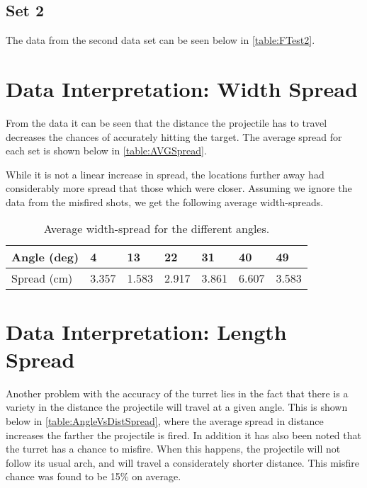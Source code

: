 \subsection{Set 2}
The data from the second data set can be seen below in \autoref{table:FTest2}. 

\section{Data Interpretation: Width Spread}
From the data it can be seen that the distance the projectile has to travel
decreases the chances of accurately hitting the target. The average spread for
each set is shown below in \autoref{table:AVGSpread}.


While it is not a linear increase in spread, the locations further away had
considerably more spread that those which were closer. Assuming we ignore the
data from the misfired shots, we get the following average width-spreads. 

\begin{table}[H]
\centering
\begin{tabular}{|l|l|l|l|l|l|l|}
\hline
Angle (deg) & 4     & 13    & 22    & 31    & 40    & 49    \\ \hline
Spread (cm) & 3.357 & 1.583 & 2.917 & 3.861 & 6.607 & 3.583 \\ \hline
\end{tabular}
\caption{Average width-spread for the different angles.}
\end{table}

\section{Data Interpretation: Length Spread}
Another problem with the accuracy of the turret lies in the fact that there is a
variety in the distance the projectile will travel at a given angle. This is shown below in
\autoref{table:AngleVsDistSpread}, where the average spread in distance
increases the farther the projectile is fired. In addition it has also been noted that
the turret has a chance to misfire. When this happens, the projectile will not
follow its usual arch, and will travel a considerately shorter distance. This
misfire chance was found to be 15\% on average.


